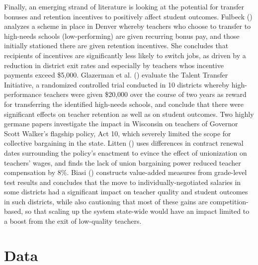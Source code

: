 Finally, an emerging strand of literature is looking at the potential
for transfer bonuses and retention incentives to positively affect
student outcomes. Fulbeck (\citeyear{fulbeck})
analyzes a scheme in place in Denver whereby teachers who choose to
transfer to high-needs schools (low-performing) are given recurring
bonus pay, and those initially stationed there are given retention
incentives. She concludes that recipients of incentives are
significantly less likely to switch jobs, as driven by a reduction in
district exit rates and especially by teachers whos incentive payments
exceed \$5,000. Glazerman et al.
(\citeyear{glazerman}) evaluate the Talent Transfer
Initiative, a randomized controlled trial conducted in 10 districts
whereby high-performance teachers were given \$20,000 over the course of
two years as reward for transferring the identified high-needs schools,
and conclude that there were significant effects on teacher retention as
well as on student outcomes. Two highly germane papers investigate the
impact in Wisconsin on teachers of Governor Scott Walker's flagship
policy, Act 10, which severely limited the scope for collective
bargaining in the state. Litten (\citeyear{litten})
uses differences in contract renewal dates surrounding the policy's
enactment to evince the effect of unionization on teachers' wages, and
finds the lack of union bargaining power reduced teacher compensation by
8\%. Biasi (\citeyear{biasi}) constructs value-added
measures from grade-level test results and concludes that the move to
individually-negotiated salaries in some districts had a significant
impact on teacher quality and student outcomes in such districts, while
also cautioning that most of these gains are competition-based, so that
scaling up the system state-wide would have an impact limited to a boost
from the exit of low-quality teachers.

\section{Data}\label{data}

